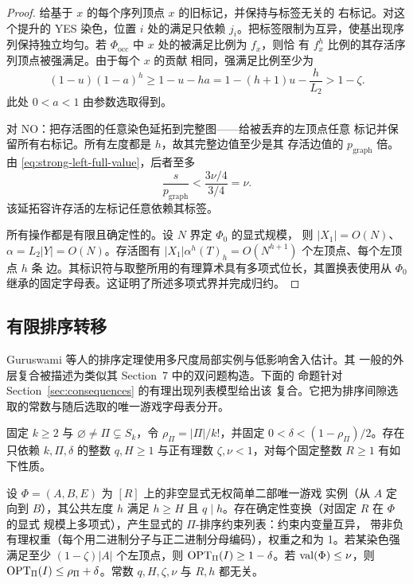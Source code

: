 \begin{proof}
给基于 \(x\) 的每个序列顶点 \(x\) 的旧标记，并保持与标签无关的
右标记。对这个提升的 YES 染色，位置 \(i\) 处的满足只依赖
\(j_i\)。把标签限制为互异，使基出现序列保持独立均匀。若
\(\Phi_{\mathrm{occ}}\) 中 \(x\) 处的被满足比例为 \(f_x\)，则恰
有 \(f_x^h\) 比例的其存活序列顶点被强满足。由于每个 \(x\) 的贡献
相同，强满足比例至少为
\[
 (1-u)(1-a)^h
 \ge 1-u-ha
 =1-(h+1)u-\frac h{L_2}>1-\zeta.
\]
此处 \(0<a<1\) 由参数选取得到。

对 NO：把存活图的任意染色延拓到完整图——给被丢弃的左顶点任意
标记并保留所有右标记。所有左度都是 \(h\)，故其完整边值至少是其
存活边值的 \(p_{\mathrm{graph}}\) 倍。由
\eqref{eq:strong-left-full-value}，后者至多
\[
 \frac{s}{p_{\mathrm{graph}}}<\frac{3\nu/4}{3/4}=\nu.
\]
该延拓容许存活的左标记任意依赖其标签。

所有操作都是有限且确定性的。设 \(N\) 界定 \(\Phi_0\) 的显式规模，
则 \(|X_1|=O(N)\)、\(\alpha=L_2|Y|=O(N)\)。存活图有
\(|X_1|\alpha^h(T)_h=O(N^{h+1})\) 个左顶点、每个左顶点 \(h\) 条
边。其标识符与取整所用的有理算术具有多项式位长，其置换表使用从
\(\Phi_0\) 继承的固定字母表。这证明了所述多项式界并完成归约。
\end{proof}

\subsection{有限排序转移}

Guruswami 等人的排序定理使用多尺度局部实例与低影响舍入估计。其
一般的外层复合被描述为类似其 Section~7 中的双问题构造。下面的
命题针对 Section~\ref{sec:consequences} 的有理出现列表模型给出该
复合。它把为排序间隙选取的常数与随后选取的唯一游戏字母表分开。

\begin{proposition}[有限排序转移]
\label{prop:finite-ordering-transfer}
固定 \(k\ge2\) 与 \(\varnothing\ne\Pi\subsetneq S_k\)，令
\(\rho_\Pi=|\Pi|/k!\)，并固定 \(0<\delta<(1-\rho_\Pi)/2\)。存在
只依赖 \(k,\Pi,\delta\) 的整数 \(q,H\ge1\) 与正有理数
\(\zeta,\nu<1\)，对每个固定整数 \(R\ge1\) 有如下性质。

设 \(\Phi=(A,B,E)\) 为 \([R]\) 上的非空显式无权简单二部唯一游戏
实例（从 \(A\) 定向到 \(B\)），其公共左度 \(h\) 满足 \(h\ge H\)
且 \(q\mid h\)。存在确定性变换（对固定 \(R\) 在 \(\Phi\) 的显式
规模上多项式），产生显式的 \(\Pi\)-排序约束列表：约束内变量互异，
带非负有理权重（每个用二进制分子与正二进制分母编码），权重之和为
1。若某染色强满足至少 \((1-\zeta)|A|\) 个左顶点，则
\(\operatorname{OPT}_\Pi(I)\ge1-\delta\)。若 \(\operatorname{val}(\Phi)\le\nu\)，则
\(\operatorname{OPT}_\Pi(I)\le\rho_\Pi+\delta\)。常数 \(q,H,\zeta,\nu\) 与
\(R,h\) 都无关。
\end{proposition}

